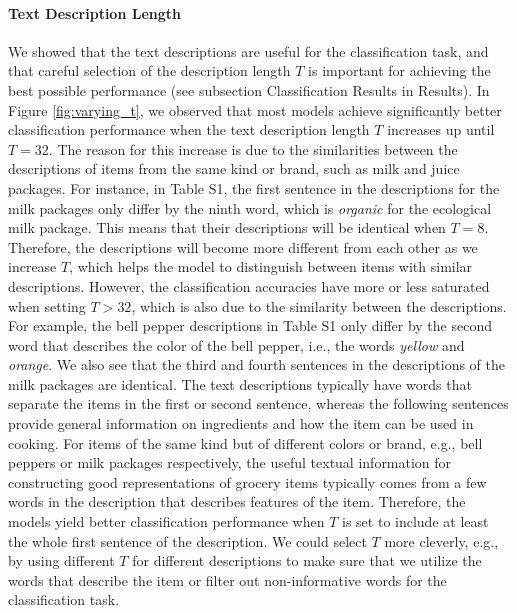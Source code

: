 \paragraph{Text Description Length} We showed 
that the text descriptions are useful for the classification task, and that careful selection of the description length $T$ is important for achieving the best possible performance (see subsection Classification Results in Results). In Figure \ref{fig:varying_t}, we observed that most models achieve significantly better classification performance when the text description length $T$ increases up until $T=32$. The reason for this increase is due to the similarities between the descriptions of items from the same kind or brand, such as milk and juice packages. 
For instance, in Table S1, the first sentence in the descriptions for the milk packages only differ by the ninth word, which is \textit{organic} for the ecological milk package. 
This means that their descriptions will be identical when $T=8$. Therefore, the descriptions will become more different from each other as we increase $T$, which helps the model to distinguish between items with similar descriptions. However, the classification accuracies have more or less saturated when setting $T > 32$, which is also due to the similarity between the descriptions. For example, the bell pepper descriptions in Table S1 only differ by the second word that describes the color of the bell pepper, i.e., the words \textit{yellow} and \textit{orange}. We also see that the third and fourth sentences in the descriptions of the milk packages are identical. The text descriptions typically have words that separate the items in the first or second sentence, whereas the following sentences provide general information on ingredients and how the item can be used in cooking. For items of the same kind but of different colors or brand, e.g., bell peppers or milk packages respectively, the useful textual information for constructing good representations of grocery items typically comes from a few words in the description that describes features of the item. Therefore, the models yield better classification performance when $T$ is set to include at least the whole first sentence of the description. We could select $T$ more cleverly, e.g., by using different $T$ for different descriptions to make sure that we utilize the words that describe the item or filter out non-informative words for the classification task. 

